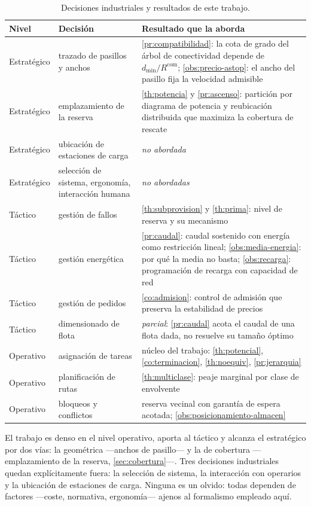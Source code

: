 \begin{table}[!ht]
\centering\small
\caption{Decisiones industriales y resultados de este trabajo.}
\label{tab:posicionamiento}
\begin{tabularx}{\textwidth}{@{}p{2.0cm}p{4.0cm}X@{}}
\toprule
Nivel & Decisión & Resultado que la aborda \\
\midrule
Estratégico & trazado de pasillos y anchos
  & \cref{pr:compatibilidad}: la cota de grado del árbol de conectividad depende
    de $d_{\min}/R^{\mathrm{com}}$; \cref{obs:precio-astop}: el ancho del pasillo
    fija la velocidad admisible \\
Estratégico & emplazamiento de la reserva
  & \cref{th:potencia} y \cref{pr:ascenso}: partición por diagrama de potencia
    y reubicación distribuida que maximiza la cobertura de rescate \\
Estratégico & ubicación de estaciones de carga
  & \emph{no abordada} \\
Estratégico & selección de sistema, ergonomía, interacción humana
  & \emph{no abordadas} \\
\midrule
Táctico & gestión de fallos
  & \cref{th:subprovision} y \cref{th:prima}: nivel de reserva y su mecanismo \\
Táctico & gestión energética
  & \cref{pr:caudal}: caudal sostenido con energía como restricción lineal;
    \cref{obs:media-energia}: por qué la media no basta;
    \cref{obs:recarga}: programación de recarga con capacidad de red \\
Táctico & gestión de pedidos
  & \cref{co:admision}: control de admisión que preserva la estabilidad de
    precios \\
Táctico & dimensionado de flota
  & \emph{parcial}: \cref{pr:caudal} acota el caudal de una flota dada, no
    resuelve su tamaño óptimo \\
\midrule
Operativo & asignación de tareas
  & núcleo del trabajo: \cref{th:potencial}, \cref{co:terminacion},
    \cref{th:noequiv}, \cref{pr:jerarquia} \\
Operativo & planificación de rutas
  & \cref{th:multiclase}: peaje marginal por clase de envolvente \\
Operativo & bloqueos y conflictos
  & reserva vecinal con garantía de espera acotada;
    \cref{obs:posicionamiento-almacen} \\
\bottomrule
\end{tabularx}
\end{table}

\begin{observacion}
\label{obs:concentracion}
El trabajo es denso en el nivel operativo, aporta al táctico y alcanza el
estratégico por dos vías: la geométrica —anchos de pasillo— y la de cobertura
—emplazamiento de la reserva, \cref{sec:cobertura}—. Tres decisiones
industriales quedan explícitamente fuera: la selección de sistema, la
interacción con operarios y la ubicación de estaciones de carga. Ninguna es un olvido: todas dependen de
factores —coste, normativa, ergonomía— ajenos al formalismo empleado aquí.
\end{observacion}

